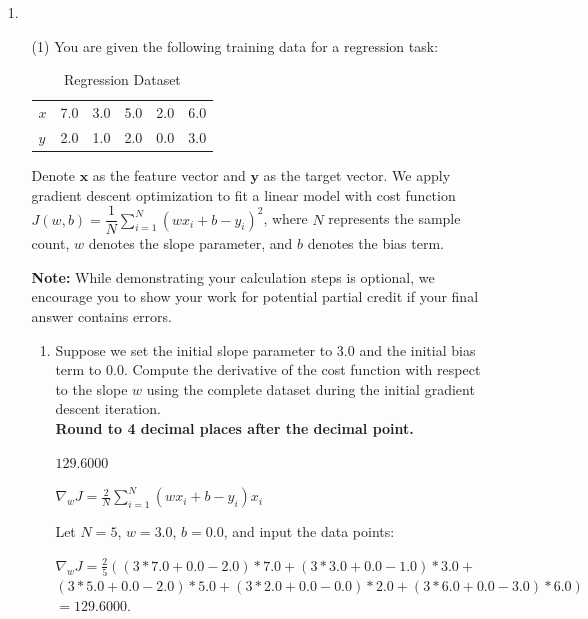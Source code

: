 \documentclass[11pt,addpoints,answers]{exam}
\newcounter{subq}        %
\renewcommand{\thesubq}{(\alph{subq})}  %
\newenvironment{subquestions}{
	\setcounter{subq}{0}%
	\begin{enumerate}[
		label=\thesubq,
		leftmargin=*,
		align=left,
		itemsep=6pt
		]
	}{
	\end{enumerate}
}
\newcommand{\subquestion}{\refstepcounter{subq}\item}  %
\begin{document}
	\begin{enumerate}
		\item[1.] 
		\begin{enumerate}[label=\alph*), itemsep=10pt]
			\item[(1)] You are given the following training data for a regression task:
			\begin{table}[H]
				\centering
				\begin{tabular}{llllll}
					$x$ & 7.0 & 3.0 & 5.0 & 2.0 & 6.0 \\
					$y$ & 2.0 & 1.0 & 2.0 & 0.0 & 3.0
				\end{tabular}
				\caption{Regression Dataset} \label{tab:reg7_data}  %
			\end{table}
			Denote $\bm{x}$ as the feature vector and $\bm{y}$ as the target vector. We apply gradient descent optimization to fit a linear model with cost function $J(w, b) = \dfrac{1}{N}\sum\limits_{i=1}^N (wx_i + b - y_i)^2$, where $N$ represents the sample count, $w$ denotes the slope parameter, and $b$ denotes the bias term.
			
			\textbf{Note:} While demonstrating your calculation steps is optional, we encourage you to show your work for potential partial credit if your final answer contains errors.
			
			\begin{subquestions}
				\subquestion Suppose we set the initial slope parameter to $3.0$ and the initial bias term to $0.0$. Compute the derivative of the cost function with respect to the slope $w$ using the complete dataset during the initial gradient descent iteration. 
				\\ \textbf{Round to 4 decimal places after the decimal point.}
				
				\begin{answer_box}[title=Gradient:,height=2cm,width=6cm]
					$129.6000$
				\end{answer_box}
				
				\begin{answer_box}[title=Work,height=6cm]
					$\nabla_w J = \frac2N\sum_{i=1}^N (wx_i + b - y_i)x_i$

					Let $N=5$, $w=3.0$, $b=0.0$, and input the data points:

					$\nabla_w J = \frac25\left((3*7.0 + 0.0 - 2.0)*7.0 + (3*3.0 + 0.0 - 1.0)*3.0 + \right.$\\
					$\left.(3*5.0 + 0.0 - 2.0)*5.0 + (3*2.0 + 0.0 - 0.0)*2.0 + (3*6.0 + 0.0 - 3.0)*6.0\right)$\\
					$= 129.6000.$


\end{answer_box}
\end{subquestions}
\end{enumerate}
\end{enumerate}
\end{document}
